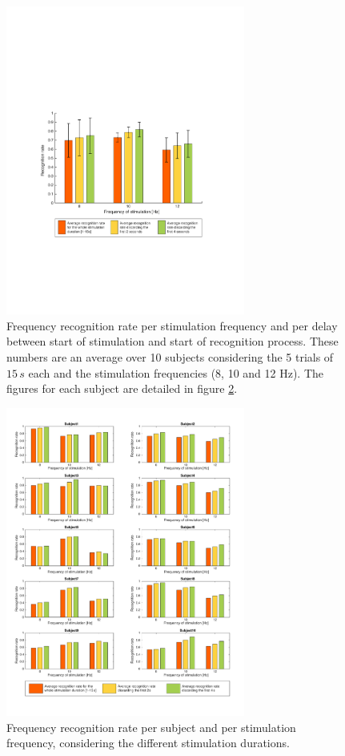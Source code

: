 \documentclass[smallextended]{svjour3}
\begin{document}
\begin{figure}
\center
\includegraphics[width=0.7\textwidth]{figures/taux-reconn.pdf}
\caption{Frequency recognition rate per stimulation frequency and per delay between start of stimulation and start of recognition process. These numbers are an average over 10 subjects considering the 5 trials of $15\,s$ each and the stimulation frequencies (8, 10 and 12 Hz). The figures for each subject are detailed in figure \ref{fig:all-results-reconn}.}
\label{fig:taux-reconn}
\end{figure}

\begin{figure}
\center
\includegraphics[width=0.7\textwidth]{figures/all-results-reconn.pdf}
\caption{Frequency recognition rate per subject and per stimulation frequency, considering the different stimulation durations.}
\label{fig:all-results-reconn}
\end{figure}
\end{document}
